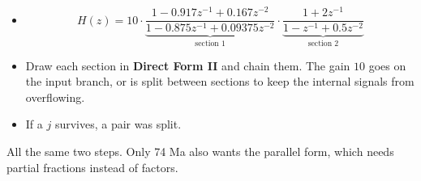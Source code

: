 \begin{itemize}
  \item[] \[ H(z)=10\cdot
             \underbrace{\frac{1-0.917z^{-1}+0.167z^{-2}}{1-0.875z^{-1}+0.09375z^{-2}}}
             _{\text{section 1}}\cdot
             \underbrace{\frac{1+2z^{-1}}{1-z^{-1}+0.5z^{-2}}}_{\text{section 2}} \]
  \item Draw each section in \textbf{Direct Form II} and chain them. The gain $10$ goes
        on the input branch, or is split between sections to keep the internal signals
        from overflowing.
  \item {} If a $j$ survives, a pair was split.
\end{itemize}

{\color{sub}\footnotesize All the same two steps. Only 74 Ma also wants the parallel
form, which needs partial fractions instead of factors.}
\par\smallskip
